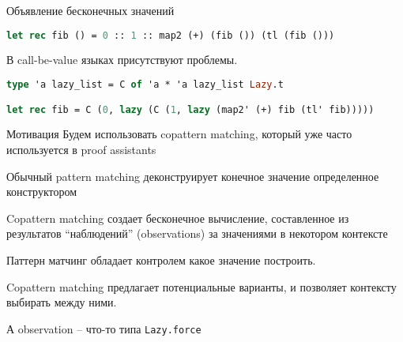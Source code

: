 \documentclass[10pt, mathserif]{beamer}
\theoremstyle{definition}
\begin{document}
\begin{frame}[fragile]{Объявление бесконечных значений}

\begin{lstlisting}[language=ocaml,mathescape=true]
let rec fib () = 0 :: 1 :: map2 (+) (fib ()) (tl (fib ()))
\end{lstlisting}
В call-be-value языках присутствуют проблемы.
\begin{lstlisting}[language=ocaml,mathescape=true]
type 'a lazy_list = C of 'a * 'a lazy_list Lazy.t

let rec fib = C (0, lazy (C (1, lazy (map2' (+) fib (tl' fib)))))

\end{lstlisting}
\end{frame}

\begin{frame}[fragile]{Мотивация}
Будем использовать copattern matching, который уже часто используется в proof assistants

Обычный pattern matching деконструирует конечное значение определенное конструктором

Copattern matching создает бесконечное вычисление, составленное из результатов 
``наблюдений'' (observations) за значениями в некотором контексте

Паттерн матчинг обладает контролем какое значение построить.

Copattern matching предлагает потенциальные варианты, и позволяет контексту выбирать между ними.

А observation -- что-то типа \lstinline{Lazy.force}
\end{frame}
\end{document}

